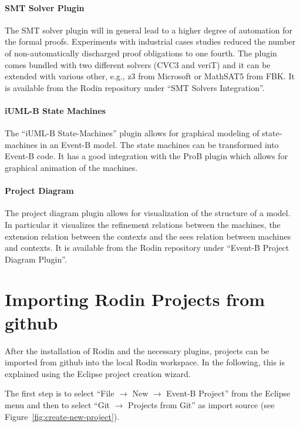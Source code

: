 \documentclass[10pt,a4paper]{article}
\begin{document}
\paragraph{SMT Solver Plugin}
\label{sec:smt-solver-plugin}

The SMT solver plugin will in general lead to a higher degree of automation for
the formal proofs. Experiments with industrial cases studies reduced the number
of non-automatically discharged proof obligations to one fourth. The plugin
comes bundled with two different solvers (CVC3 and veriT) and it can be extended
with various other, e.g., z3 from Microsoft or MathSAT5 from FBK. It is
available from the Rodin repository under ``SMT Solvers Integration''.

\paragraph{iUML-B State Machines}
\label{sec:iuml-b-state}

The ``iUML-B State-Machines'' plugin allows for graphical modeling of
state-machines in an Event-B model. The state machines can be transformed into
Event-B code. It has a good integration with the ProB plugin which allows for
graphical animation of the machines.

\paragraph{Project Diagram}
\label{sec:project-diagram}

The project diagram plugin allows for visualization of the structure of a
model. In particular it visualizes the refinement relations between the
machines, the extension relation between the contexts and the sees relation
between machines and contexts. It is available from the Rodin repository under
``Event-B Project Diagram Plugin''.

\section{Importing Rodin Projects from github}
\label{sec:import-rodin-proj}

After the installation of Rodin and the necessary plugins, projects can be
imported from github into the local Rodin workspace. In the following, this is
explained using the Eclipse project creation wizard.

The first step is to select ``File $\rightarrow$ New $\rightarrow$ Event-B
Project'' from the Eclipse menu and then to select ``Git $\rightarrow$ Projects
from Git'' as import source (see Figure~\ref{fig:create-new-project}).
\end{document}
